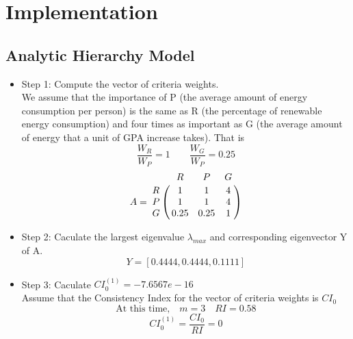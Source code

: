 \documentclass{mcmthesis}
\begin{document}
\section{Implementation} \label{Sec-Implementation}
%
\subsection{Analytic Hierarchy Model}
 
  \begin{itemize}
  	\item Step 1: Compute the vector of criteria weights.\\
  			We assume that the importance of P (the average amount of energy consumption per person) is the same as R (the percentage of renewable energy consumption) and four times as important as G (the average amount of energy that a unit of GPA increase takes). That is
  			$$
  				\frac{W_R}{W_P}=1 \qquad \frac{W_G}{W_P} = 0.25
  			$$
				$$
				A = \bordermatrix{
					& R & P & G  \cr
				R &   1 & 1 & 4 \cr
				P &   1 & 1 & 4\cr
				G & 0.25  & 0.25 & 1
					}
				$$

  	\item Step 2: Caculate the largest eigenvalue $\lambda_{max}$ and corresponding eigenvector Y of A.
  	$$Y = [0.4444, 0.4444, 0.1111]$$
  	\item Step 3: Caculate $CI^{(1)}_0 = -7.6567e-16$\\
  	Assume that the Consistency Index for the vector of criteria weights is $CI_0$
  	$$
  		\mbox{At this time,} \quad m=3 \quad RI = 0.58
  	$$
  	$$
  		CI^{(1)}_0 = \frac{CI_0}{RI}= 
  		0
  	$$


\end{itemize}
\end{document}

